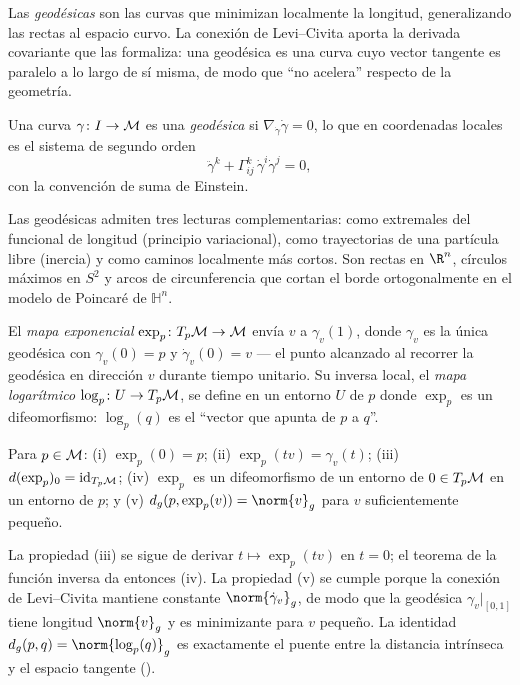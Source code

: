 Las \emph{geod\'esicas} son las curvas que minimizan localmente la longitud,
generalizando las rectas al espacio curvo. La conexi\'on de Levi--Civita aporta
la derivada covariante que las formaliza: una geod\'esica es una curva cuyo
vector tangente es paralelo a lo largo de s\'i misma, de modo que ``no acelera''
respecto de la geometr\'ia.

\begin{definition}
\label{def:geo:geodesic}
Una curva $\gamma \colon I \to \mathcal{M}$ es una \emph{geod\'esica} si
$\nabla_{\dot\gamma}\dot\gamma = 0$, lo que en coordenadas locales es el sistema
de segundo orden
\[
  \ddot\gamma^k + \Gamma^k_{ij}\, \dot\gamma^i \dot\gamma^j = 0 ,
\]
con la convenci\'on de suma de Einstein.
\end{definition}

Las geod\'esicas admiten tres lecturas complementarias: como extremales del
funcional de longitud (principio variacional), como trayectorias de una
part\'icula libre (inercia) y como caminos localmente m\'as cortos. Son rectas
en $\R^n$, c\'irculos m\'aximos en $S^2$ y arcos de circunferencia que cortan el
borde ortogonalmente en el modelo de Poincar\'e de $\mathbb{H}^n$.

\begin{definition}
\label{def:geo:exp-log}
El \emph{mapa exponencial} $\exp_p \colon T_p\mathcal{M} \to \mathcal{M}$ env\'ia $v$ a
$\gamma_v(1)$, donde $\gamma_v$ es la \'unica geod\'esica con $\gamma_v(0) = p$ y
$\dot\gamma_v(0) = v$ --- el punto alcanzado al recorrer la geod\'esica en
direcci\'on $v$ durante tiempo unitario. Su inversa local, el \emph{mapa
logar\'itmico} $\log_p \colon U \to T_p\mathcal{M}$, se define en un entorno $U$ de $p$
donde $\exp_p$ es un difeomorfismo: $\log_p(q)$ es el ``vector que apunta de $p$
a $q$''.
\end{definition}

\begin{proposition}
\label{prop:geo:exp}
Para $p \in \mathcal{M}$: (i) $\exp_p(0) = p$; (ii) $\exp_p(tv) = \gamma_v(t)$; (iii)
$d(\exp_p)_0 = \operatorname{id}_{T_p\mathcal{M}}$; (iv) $\exp_p$ es un difeomorfismo de un
entorno de $0 \in T_p\mathcal{M}$ en un entorno de $p$; y (v)
$d_g(p, \exp_p(v)) = \norm{v}_g$ para $v$ suficientemente peque\~no.
\end{proposition}

La propiedad (iii) se sigue de derivar $t \mapsto \exp_p(tv)$ en $t = 0$; el
teorema de la funci\'on inversa da entonces (iv). La propiedad (v) se cumple
porque la conexi\'on de Levi--Civita mantiene constante $\norm{\dot\gamma_v}_g$,
de modo que la geod\'esica $\gamma_v|_{[0,1]}$ tiene longitud $\norm{v}_g$ y es
minimizante para $v$ peque\~no. La identidad $d_g(p,q) = \norm{\log_p(q)}_g$ es
exactamente el puente entre la distancia intr\'inseca y el espacio tangente
().

